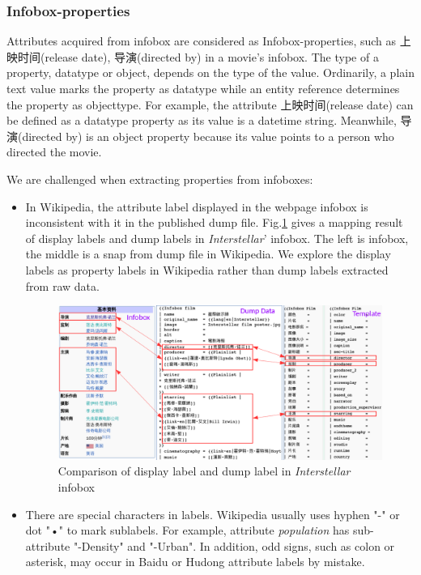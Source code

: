 \documentclass[runningheads,a4paper]{llncs}
\begin{document}
\subsubsection{Infobox-properties}
Attributes acquired from infobox are considered as Infobox-properties, such as 上映时间(release date), 导演(directed by) in a movie's infobox. The type of a property, datatype or object, depends on the type of the value. Ordinarily, a plain text value marks the property as datatype while an entity reference determines the property as objecttype. For example, the attribute 上映时间(release date) can be defined as a datatype property as its value is a datetime string. Meanwhile, 导演(directed by) is an object property because its value points to a person who directed the movie.

We are challenged when extracting properties from infoboxes:
\begin{itemize}
    \item In Wikipedia, the attribute label displayed in the webpage infobox is inconsistent with it in the published dump file. Fig.\ref{fig:infobox-template} gives a mapping result of display labels and dump labels in \emph{Interstellar}' infobox. The left is infobox, the middle is a snap from dump file in Wikipedia. We explore the display labels as property labels in Wikipedia rather than dump labels extracted from raw data.
    \begin{figure}[ht]
        \centerline{\includegraphics[width=1\columnwidth]{fig/infobox-template}}
        \caption{Comparison of display label and dump label in \emph{Interstellar} infobox}
        \label{fig:infobox-template}
    \end{figure}%
\item There are special characters in labels. Wikipedia usually uses hyphen "-" or dot "•" to mark sublabels. For example, attribute \emph{population} has sub-attribute "-Density" and "-Urban". In addition, odd signs, such as colon or asterisk, may occur in Baidu or Hudong attribute labels by mistake.
\end{itemize}
\end{document}
